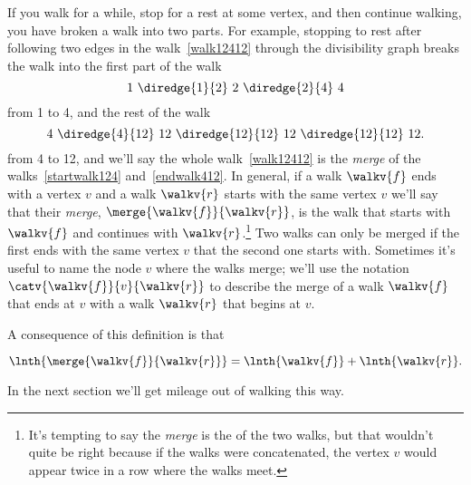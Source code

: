 If you walk for a while, stop for a rest at some vertex, and then
continue walking, you have broken a walk into two parts.  For example,
stopping to rest after following two edges in the walk~\eqref{walk12412}
through the divisibility graph breaks the walk into the first part of the walk
\begin{equation}\label{startwalk124}
1\ \diredge{1}{2}\  2\  \diredge{2}{4}\  4
\end{equation}
from 1 to 4, and the rest of the walk
\begin{equation}\label{endwalk412}
4\ \diredge{4}{12}\  12\  \diredge{12}{12}\  12\ \diredge{12}{12}\  12.
\end{equation}
from 4 to 12, and we'll say the whole walk~\eqref{walk12412} is the
\emph{merge}%
of the walks~\eqref{startwalk124} and~\eqref{endwalk412}.
In general, if a walk $\walkv{f}$ ends with a vertex $v$ and a walk
$\walkv{r}$ starts with the same vertex $v$ we'll say that their
\emph{merge}, $\merge{\walkv{f}}{\walkv{r}}$, is the walk that starts
with $\walkv{f}$ and continues with $\walkv{r}$.\footnote{It's
  tempting to say the \emph{merge} is the  of the
  two walks, but that wouldn't quite be right because if the walks
  were concatenated, the vertex $v$ would appear twice in a row where
  the walks meet.}  Two walks can only be merged if the first ends
with the same vertex $v$ that the second one starts with.  Sometimes
it's useful to name the node $v$ where the walks merge; we'll use the
notation $\catv{\walkv{f}}{v}{\walkv{r}}$ to describe the merge of a
walk $\walkv{f}$ that ends at $v$ with a walk $\walkv{r}$ that begins
at $v$.

\iffalse
 Here's a precise definition:
\begin{definition}
If a walk $\walkv{f}$ ends at a vertex $v$ and a walk $\walkv{r}$
begins at the same vertex $v$, then the \term{$v$-merge} of
$\walkv{f}$ with $\walkv{r}$, written,
\[
\catv{\walkv{f}}{v}{\walkv{r}},
\]
is the walk whose vertex sequence is the vertex sequence of
$\walkv{f}$ concatenated with the vertex sequence of $\walkv{r}$
without its initial $v$.  That is, if
\begin{align*}
\walkv{r} & = v\,\vec{\alpha},
\end{align*}
for some finite sequence $\vec{\alpha}$ of vertices,
then
\[
\catv{\walkv{f}}{v}{\walkv{r}} \eqdef  \walkv{f}\alpha.
\]
\end{definition}
\fi

A consequence of this definition is that
\begin{lemma}\label{sumoflengths}
\[
\lnth{\merge{\walkv{f}}{\walkv{r}}} = \lnth{\walkv{f}} + \lnth{\walkv{r}}.
\]
\end{lemma}
In the next section we'll get mileage out of walking this way.

